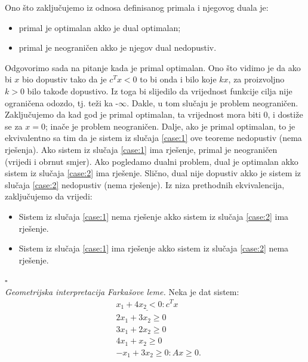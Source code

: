 \documentclass[a4paper, utf8, 11pt, colorlinks]{book}
\newenvironment{proof}{{Dokaz:}}{\hfill$\square$}
\begin{document}
\begin{proof}
  Ono što zaključujemo iz odnosa definisanog primala i njegovog duala je:
  \begin{itemize}
  	\item primal je optimalan akko je dual optimalan; 
  	\item primal je neograničen  akko je njegov dual nedopustiv.  
  \end{itemize}
  Odgovorimo sada na pitanje kada je primal optimalan. Ono što vidimo je da ako bi $x$ bio dopustiv tako da je $c^Tx < 0$ to bi onda i bilo koje $kx$, za proizvoljno $k>0$ bilo takođe dopustivo. Iz toga bi slijedilo da vrijednost funkcije cilja nije ograničena odozdo, tj. teži ka -$\infty$. Dakle, u tom slučaju je problem neograničen. Zaključujemo da kad god je primal optimalan, ta vrijednost mora biti 0, i dostiže se za $x =0$; inače je problem neograničen. Dalje, ako je primal optimalan, to  je ekvivalentno sa tim da je sistem iz slučaja  \ref{case:1} ove teoreme nedopustiv (nema rješenja).  Ako sistem iz slučaja  \ref{case:1}  ima rješenje, primal je neograničen (vrijedi i obrnut smjer). Ako pogledamo   dualni problem, dual je optimalan akko sistem iz  slučaja  \ref{case:2}   ima rješenje. Slično, dual nije dopustiv akko je sistem iz  slučaja   \ref{case:2}  nedopustiv (nema rješenje). Iz niza prethodnih ekvivalencija, zaključujemo da vrijedi: 
  \begin{itemize}
  	  \item Sistem iz  slučaja  \ref{case:1}  nema rješenje akko sistem iz  slučaja  \ref{case:2}   ima rješenje. 
  	  \item Sistem iz  slučaja  \ref{case:1}  ima rješenje akko sistem iz  slučaja  \ref{case:2}  nema rješenje. 
   \end{itemize}
\end{proof}\\

\emph{Geometrijska interpretacija Farkašove leme.}
Neka je dat sistem:
\begin{align*}
	& \underline{x_1 + 4 x_2  < 0: c^T x}\\  
	& 2 x_1 + 3 x_2 \geq 0 \\
	& 3 x_1 + 2 x_2 \geq 0 \\
	& 4 x_1 + x_2 \geq 0 \\
	& -x_1 + 3 x_2 \geq 0: Ax \geq 0.
\end{align*}
\end{document}
